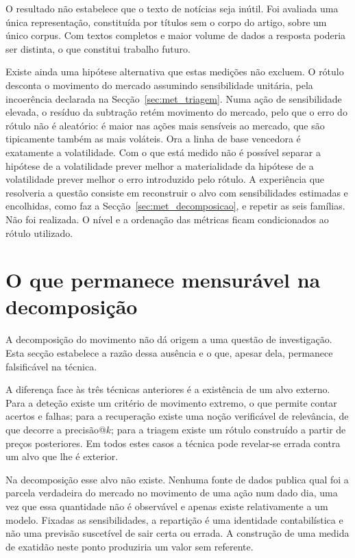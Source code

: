 O resultado não estabelece que o texto de notícias seja inútil. Foi avaliada uma única representação,
constituída por títulos sem o corpo do artigo, sobre um único corpus. Com textos completos e maior
volume de dados a resposta poderia ser distinta, o que constitui trabalho futuro.

Existe ainda uma hipótese alternativa que estas medições não excluem. O rótulo desconta o movimento
do mercado assumindo sensibilidade unitária, pela incoerência declarada na
Secção~\ref{sec:met_triagem}. Numa ação de sensibilidade elevada, o resíduo da subtração retém
movimento do mercado, pelo que o erro do rótulo não é aleatório: é maior nas ações mais sensíveis ao
mercado, que são tipicamente também as mais voláteis. Ora a linha de base vencedora é exatamente a
volatilidade. Com o que está medido não é possível separar a hipótese de a volatilidade prever melhor
a materialidade da hipótese de a volatilidade prever melhor o erro introduzido pelo rótulo. A experiência que resolveria a questão consiste em reconstruir o alvo com sensibilidades estimadas
e encolhidas, como faz a Secção~\ref{sec:met_decomposicao}, e repetir as seis famílias. Não foi
realizada. O nível e a ordenação das métricas ficam condicionados ao rótulo utilizado.

\section{O que permanece mensurável na decomposição}
\label{sec:av_decomposicao}

A decomposição do movimento não dá origem a uma questão de investigação. Esta secção estabelece a
razão dessa ausência e o que, apesar dela, permanece falsificável na técnica.

A diferença face às três técnicas anteriores é a existência de um alvo externo. Para a deteção existe
um critério de movimento extremo, o que permite contar acertos e falhas; para a recuperação existe
uma noção verificável de relevância, de que decorre a precisão@$k$; para a triagem existe um rótulo
construído a partir de preços posteriores. Em todos estes casos a técnica pode revelar-se errada
contra um alvo que lhe é exterior.

Na decomposição esse alvo não existe. Nenhuma fonte de dados publica qual foi a parcela verdadeira do
mercado no movimento de uma ação num dado dia, uma vez que essa quantidade não é observável e apenas
existe relativamente a um modelo. Fixadas as sensibilidades, a repartição é uma identidade
contabilística e não uma previsão suscetível de sair certa ou errada. A construção de uma medida de
exatidão neste ponto produziria um valor sem referente.

